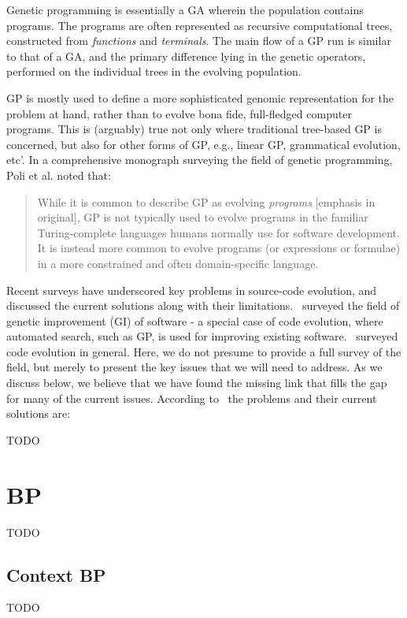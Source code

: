\documentclass{article}
\begin{document}
Genetic programming is essentially a GA wherein the population contains programs. The programs are often represented as recursive computational trees, constructed from \emph{functions} and \emph{terminals}. The main flow of a GP run is similar to that of a GA, and the primary difference lying in the genetic operators, performed on the individual trees in the evolving population.

GP is mostly used to define a more sophisticated genomic representation for the problem at hand,
rather than to evolve bona fide, full-fledged computer programs. This is (arguably) true not only where traditional
tree-based GP is concerned, but also for other forms of GP, e.g., linear GP, grammatical evolution, etc'.
In a comprehensive monograph surveying the field of genetic programming, Poli et al. noted that:

\begin{quotation}
While it is common to describe GP as evolving \emph{programs} [emphasis in original], GP is not typically used to evolve programs in the familiar Turing-complete languages humans normally use for software development. It is instead more common to evolve programs (or expressions or formulae) in a more constrained and often domain-specific language.
\end{quotation}

Recent surveys have underscored key problems in source-code evolution, and discussed the current
solutions along with their limitations.~\cite{Petke2018} surveyed the field of genetic improvement (GI) of software -
a special case of code evolution, where automated search, such as GP, is used for improving existing software.
\cite{Banzhaf2018}~surveyed code evolution in general. Here, we do not presume to provide a full survey of the field,
but merely to present the key issues that we will need to address. As we discuss below, we believe that we have found
the missing link that fills the gap for many of the current issues. According to~\cite{Banzhaf2018, Petke2018}
the problems and their current solutions are:

    {\Large TODO}

\section{BP}
    {\Large TODO}

    \subsection{Context BP}
    {\large TODO}
\end{document}
